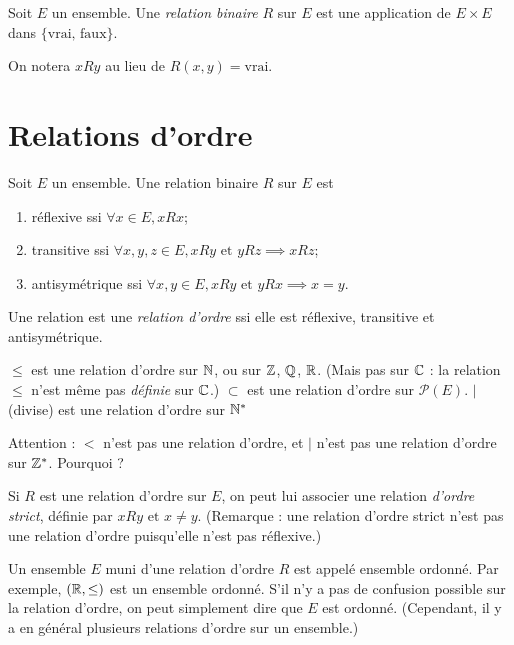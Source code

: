 
\begin{definition} Soit $E$ un ensemble. Une \emph{relation binaire} $R$ sur $E$ est une application de $E\times E$ dans $\{\text{vrai, faux}\}$.
\end{definition}

On notera $xRy$ au lieu de $R(x,y)=\text{vrai}$.

\section{Relations d'ordre}

\begin{definition}
Soit $E$ un ensemble. Une relation binaire $R$ sur $E$ est
\begin{enumerate}
\item réflexive ssi $\forall x\in E, xRx$;
\item transitive ssi $\forall x, y, z\in E, xRy \text{ et } yRz \implies xRz$;
\item antisymétrique ssi $\forall x, y \in E, xRy\text{ et } yRx \implies x=y$.
\end{enumerate}

Une relation est une \emph{relation d'ordre} ssi elle est réflexive, transitive et antisymétrique.
\end{definition}

\begin{exemples}
$\leq$ est une relation d'ordre sur $\mathbb{N}$, ou sur $\mathbb{Z}$, $\mathbb{Q}$, $\mathbb{R}$. (Mais pas sur $\mathbb{C}$ : la relation $\leq$ n'est même pas \emph{définie} sur $\mathbb{C}$.)
$\subset$ est une relation d'ordre sur $\mathcal P(E)$.
$|$ (\og divise\fg) est une relation d'ordre sur $\mathbb{N}^*$
\end{exemples}

Attention : $<$ n'est pas une relation d'ordre, et $|$ n'est pas une relation d'ordre sur $\mathbb{Z}^*$. Pourquoi ?

\begin{definition}
Si $R$ est une relation d'ordre sur $E$, on peut lui associer une relation \emph{d'ordre strict}, définie par \og$ xRy\text{ et }x\neq y$\fg. (Remarque : une relation d'ordre strict n'est pas une relation d'ordre puisqu'elle n'est pas réflexive.)
\end{definition}

Un ensemble $E$ muni d'une relation d'ordre $R$ est appelé ensemble ordonné. Par exemple, $(\mathbb{R}, \leq)$ est un ensemble ordonné. S'il n'y a pas de confusion possible sur la relation d'ordre, on peut simplement dire que $E$ est ordonné. (Cependant, il y a en général plusieurs relations d'ordre sur un ensemble.)

